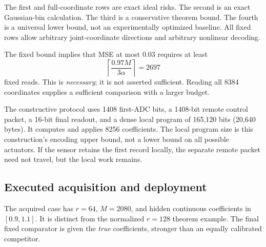 \documentclass[11pt]{article}
\begin{document}
The first and full-coordinate rows are exact ideal risks. The second is an exact Gaussian-bin calculation. The third is a conservative theorem bound. The fourth is a universal lower bound, not an experimentally optimized baseline. All fixed rows allow arbitrary joint-coordinate directions and arbitrary nonlinear decoding.

The fixed bound implies that MSE at most $0.03$ requires at least
\[
\left\lceil\frac{0.97M}{3\alpha}\right\rceil=2697
\]
fixed reads. This is \emph{necessary}; it is not asserted sufficient. Reading all 8384 coordinates supplies a sufficient comparison with a larger budget.

The constructive protocol uses 1408 first-ADC bits, a 1408-bit remote control packet, a 16-bit final readout, and a dense local program of 165,120 bits (20,640 bytes). It computes and applies 8256 coefficients. The local program size is this construction's encoding upper bound, not a lower bound on all possible actuators. If the sensor retains the first record locally, the separate remote packet need not travel, but the local work remains.

\subsection{Executed acquisition and deployment}

The acquired case has $r=64$, $M=2080$, and hidden continuous coefficients in $[0.9,1.1]$. It is distinct from the normalized $r=128$ theorem example. The final fixed comparator is given the \emph{true} coefficients, stronger than an equally calibrated competitor.
\end{document}
